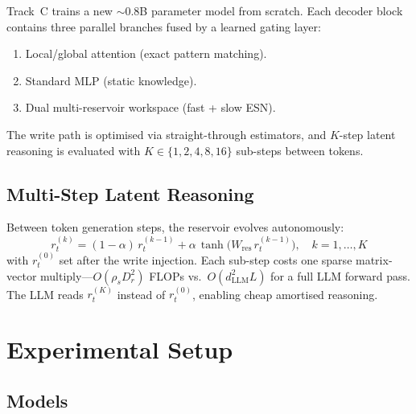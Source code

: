 \documentclass[11pt,a4paper]{article}
\theoremstyle{definition}
\begin{document}
Track~C trains a new $\sim$0.8B parameter model from scratch.  Each decoder
block contains three parallel branches fused by a learned gating layer:
\begin{enumerate}
  \item Local/global attention (exact pattern matching).
  \item Standard MLP (static knowledge).
  \item Dual multi-reservoir workspace (fast + slow ESN).
\end{enumerate}
The write path is optimised via straight-through estimators, and $K$-step
latent reasoning is evaluated with $K \in \{1, 2, 4, 8, 16\}$ sub-steps
between tokens.

\subsection{Multi-Step Latent Reasoning}
\label{sec:latent_reasoning}

Between token generation steps, the reservoir evolves autonomously:
\begin{equation}
  r_t^{(k)} = (1 - \alpha)\, r_t^{(k-1)}
             + \alpha\, \tanh\!\bigl(W_{\mathrm{res}}\, r_t^{(k-1)}\bigr),
  \quad k = 1, \ldots, K
  \label{eq:substep}
\end{equation}
with $r_t^{(0)}$ set after the write injection.  Each sub-step costs one
sparse matrix-vector multiply---$O(\rho_s D_r^2)$ FLOPs vs.\
$O(d_{\mathrm{LLM}}^2 L)$ for a full LLM forward pass.  The LLM reads
$r_t^{(K)}$ instead of $r_t^{(0)}$, enabling cheap amortised reasoning.

\section{Experimental Setup}
\label{sec:setup}

\subsection{Models}
\end{document}

